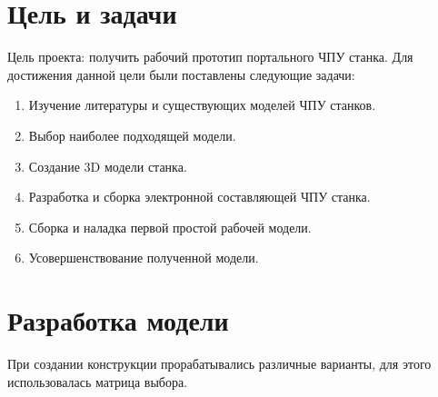 \documentclass[a4paper,12pt]{article}
\theoremstyle{plain}                          %
\theoremstyle{definition}                     %
\theoremstyle{remark}                         %
\begin{document}
\section{Цель и задачи}

Цель проекта: получить рабочий прототип портального ЧПУ станка.
Для достижения данной цели были поставлены следующие задачи:

\begin{enumerate}

    \item Изучение литературы и существующих моделей ЧПУ станков.
    \item Выбор наиболее подходящей модели.
    \item Создание 3D модели станка.
    \item Разработка и сборка электронной составляющей ЧПУ станка.
    \item Сборка и наладка первой простой рабочей модели.
    \item Усовершенствование полученной модели.

\end{enumerate}


\newpage
\section{Разработка модели}

При создании конструкции прорабатывались различные варианты, для этого использовалась матрица выбора.
\end{document}

